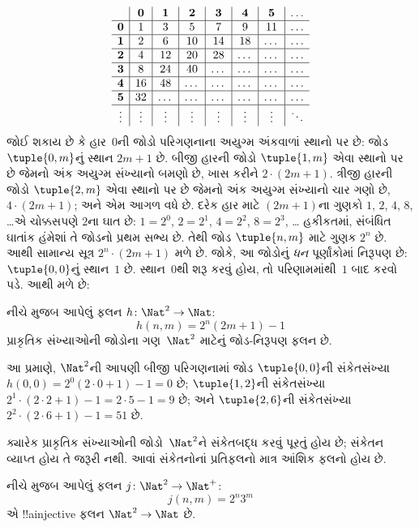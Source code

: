 \documentclass[../../../include/open-logic-section]{subfiles}
\begin{document}
\begin{explain}
\[
\begin{array}{ c | c | c | c | c | c | c | c }
& \mathbf 0 & \mathbf 1 & \mathbf 2 & \mathbf 3 & \mathbf 4 & \mathbf 5 & \dots \\
\hline
\mathbf 0 & 1 & 3 & 5 & 7 & 9 & 11 & \dots \\
\hline
\mathbf 1 & 2 & 6 & 10 & 14 & 18 & \dots & \dots \\
\hline
\mathbf 2 & 4 & 12 & 20 & 28 & \dots & \dots & \dots \\
\hline
\mathbf 3 & 8 & 24 & 40 & \dots & \dots & \dots & \dots \\
\hline
\mathbf 4 & 16 & 48 & \dots & \dots & \dots & \dots & \dots \\
\hline
\mathbf 5 & 32 & \dots & \dots & \dots & \dots & \dots & \dots \\
\hline
\vdots & \vdots & \vdots & \vdots & \vdots & \vdots & \vdots & \ddots\\
\end{array}
\]
જોઈ શકાય છે કે હાર~$0$ની જોડો પરિગણનાના અયુગ્મ
અંકવાળાં સ્થાનો પર છે: જોડ $\tuple{0,m}$નું સ્થાન
$2m+1$ છે. બીજી હારની જોડો $\tuple{1,m}$ એવા
સ્થાનો પર છે જેમનો અંક અયુગ્મ સંખ્યાનો બમણો છે,
ખાસ કરીને $2 \cdot (2m+1)$.
ત્રીજી હારની જોડો $\tuple{2,m}$ એવા સ્થાનો પર
છે જેમનો અંક અયુગ્મ સંખ્યાનો ચાર ગણો છે,
$4 \cdot (2m+1)$; અને એમ આગળ વધે છે.
દરેક હાર માટે $(2m+1)$ના ગુણકો
$1$, $2$, $4$, $8$, \dots એ ચોક્કસપણે
$2$ના ઘાત છે: $1= 2^0$, $2 = 2^1$,
$4 = 2^2$, $8 = 2^3$, \dots\@
હકીકતમાં, સંબંધિત ઘાતાંક હંમેશાં તે જોડનો પ્રથમ
સભ્ય છે. તેથી જોડ $\tuple{n,m}$ માટે ગુણક
$2^n$ છે. આથી સામાન્ય સૂત્ર $2^n \cdot (2m+1)$
મળે છે. જોકે, આ જોડોનું \emph{ધન} પૂર્ણાંકોમાં
નિરૂપણ છે: $\tuple{0,0}$નું સ્થાન~$1$ છે.
સ્થાન~$0$થી શરૂ કરવું હોય, તો પરિણામમાંથી~$1$
બાદ કરવો પડે. આથી મળે છે:
\end{explain}

\begin{ex}
નીચે મુજબ આપેલું ફલન $h\colon \Nat^2 \to \Nat$:
\[
h(n,m) = 2^n (2m+1) - 1
\]
પ્રાકૃતિક સંખ્યાઓની જોડોના ગણ~$\Nat^2$ માટેનું
જોડ-નિરૂપણ ફલન છે.
\end{ex}

\begin{explain}
આ પ્રમાણે, $\Nat^2$ની આપણી બીજી પરિગણનામાં
જોડ $\tuple{0,0}$ની સંકેતસંખ્યા
$h(0,0) = 2^0(2\cdot 0+1) - 1 = 0$ છે;
$\tuple{1,2}$ની સંકેતસંખ્યા
$2^{1} \cdot (2 \cdot 2 + 1) - 1 = 2
\cdot 5 - 1 = 9$ છે; અને $\tuple{2,6}$ની
સંકેતસંખ્યા $2^{2} \cdot (2
\cdot 6 + 1) - 1 = 51$ છે.
\end{explain}

ક્યારેક પ્રાકૃતિક સંખ્યાઓની જોડો~$\Nat^2$ને
સંકેતબદ્ધ કરવું પૂરતું હોય છે; સંકેતન વ્યાપ્ત હોય
તે જરૂરી નથી. આવાં સંકેતનોનાં પ્રતિફલનો
માત્ર આંશિક ફલનો હોય છે.

\begin{ex}
નીચે મુજબ આપેલું ફલન $j\colon \Nat^2 \to \Nat^+$:
\[
j(n,m) = 2^n3^m
\]
એ !!a{injective} ફલન $\Nat^2 \to \Nat$ છે.
\end{ex}
\end{document}
